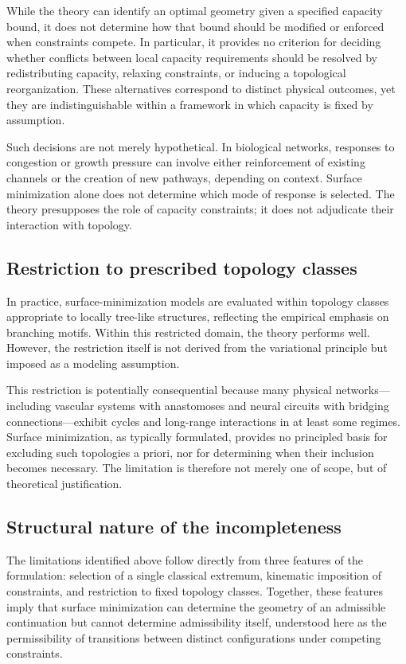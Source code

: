 While the theory can identify an optimal geometry given a specified capacity bound, it does not determine how that bound should be modified or enforced when constraints compete. In particular, it provides no criterion for deciding whether conflicts between local capacity requirements should be resolved by redistributing capacity, relaxing constraints, or inducing a topological reorganization. These alternatives correspond to distinct physical outcomes, yet they are indistinguishable within a framework in which capacity is fixed by assumption.

Such decisions are not merely hypothetical. In biological networks, responses to congestion or growth pressure can involve either reinforcement of existing channels or the creation of new pathways, depending on context. Surface minimization alone does not determine which mode of response is selected. The theory presupposes the role of capacity constraints; it does not adjudicate their interaction with topology.

\subsection{Restriction to prescribed topology classes}

In practice, surface-minimization models are evaluated within topology classes appropriate to locally tree-like structures, reflecting the empirical emphasis on branching motifs. Within this restricted domain, the theory performs well. However, the restriction itself is not derived from the variational principle but imposed as a modeling assumption.

This restriction is potentially consequential because many physical networks---including vascular systems with anastomoses and neural circuits with bridging connections---exhibit cycles and long-range interactions in at least some regimes. Surface minimization, as typically formulated, provides no principled basis for excluding such topologies a priori, nor for determining when their inclusion becomes necessary. The limitation is therefore not merely one of scope, but of theoretical justification.

\subsection{Structural nature of the incompleteness}

The limitations identified above follow directly from three features of the formulation: selection of a single classical extremum, kinematic imposition of constraints, and restriction to fixed topology classes. Together, these features imply that surface minimization can determine the geometry of an admissible continuation but cannot determine admissibility itself, understood here as the permissibility of transitions between distinct configurations under competing constraints.

